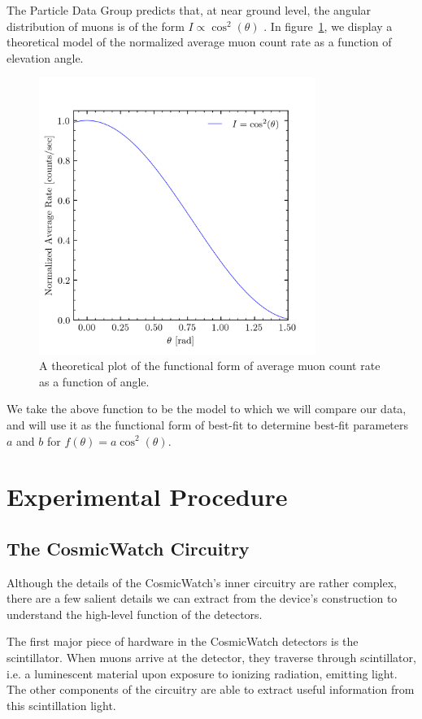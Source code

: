 \documentclass[aps,twocolumn,secnumarabic,balancelastpage,amsmath,amssymb,nofootinbib, floatfix]{revtex4-2}
\begin{document}
 	The Particle Data Group predicts that, at near ground level, the angular distribution of muons is of the form $I\propto\cos^{2}(\theta)$ \cite{pdg}. In figure~\ref{fig:model}, we display a theoretical model of the normalized average muon count rate as a function of elevation angle.
	\begin{figure}
		\includegraphics[width=9cm]{theor_avg_vs_theta.png}
		\caption{A theoretical plot of the functional form of average muon count rate as a function of angle.}
		\label{fig:model}
	\end{figure}
	We take the above function to be the model to which we will compare our data, and will use it as the functional form of best-fit to determine best-fit parameters $a$ and $b$ for $f(\theta)=a\cos^{2}(\theta)$.
	
	
	\section{Experimental Procedure}

	\subsection{The CosmicWatch Circuitry}
	Although the details of the CosmicWatch's inner circuitry are rather complex, there are a few salient details we can extract from the device's construction to understand the high-level function of the detectors.
	
	The first major piece of hardware in the CosmicWatch detectors is the scintillator. When muons arrive at the detector, they traverse through scintillator, i.e. a luminescent material upon exposure to ionizing radiation, emitting light. The other components of the circuitry are able to extract useful information from this scintillation light.
	
\end{document}
